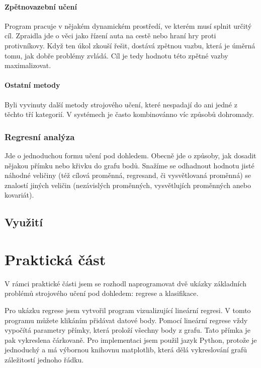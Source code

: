 \documentclass[a4paper,12pt, oneside]{book}
\begin{document}
\subsubsection{Zpětnovazební učení}

Program pracuje v nějakém dynamickém prostředí, ve kterém musí splnit určitý cíl.
Zpraidla jde o věci jako řízení auta na cestě nebo hraní hry proti protivníkovy.
Když ten úkol zkouší řešit, dostává zpětnou vazbu, která je úměrná
tomu, jak dobře problémy zvládá. Cíl je tedy hodnotu této zpětné vazby maximalizovat.

\subsubsection{Ostatní metody}

Byli vyvinuty další metody strojového učení, které nespadají do ani jedné z těchto
tří kategorií. V systémech je často kombinovánno víc způsobů dohromady.

\subsection{Regresní analýza}

Jde o jednoduchou formu učení pod dohledem. Obecně jde o způsoby, jak dosadit nějakou
přímku nebo křivku do grafu bodů. Snažíme se odhadnout hodnotu jisté náhodné veličiny
(též cílová proměnná, regresand, či vysvětlovaná proměnná) se znalostí jiných veličin
(nezávislých proměnných, vysvětlujích proměnných anebo kovariát).

\section{Využití}






\chapter{Praktická část}

V rámci praktické části jsem se rozhodl naprogramovat dvě ukázky
základních problémů strojového učení pod dohledem: regrese a klasifikace.

Pro ukázku regrese jsem vytvořil program vizualizující lineární regresi.
V tomto programu můžete klikáním přidávat datové body. Pomocí lineární regrese
vždy vypočítá parametry přímky, která proloží všechny body z grafu. Tato přímka
je pak vykreslena čárkovaně.
Pro implementaci jsem použil jazyk Python, protože je jednoduchý a má výbornou
knihovnu matplotlib, která dělá vykreslování grafů záležitostí jednoho řádku.
\end{document}
